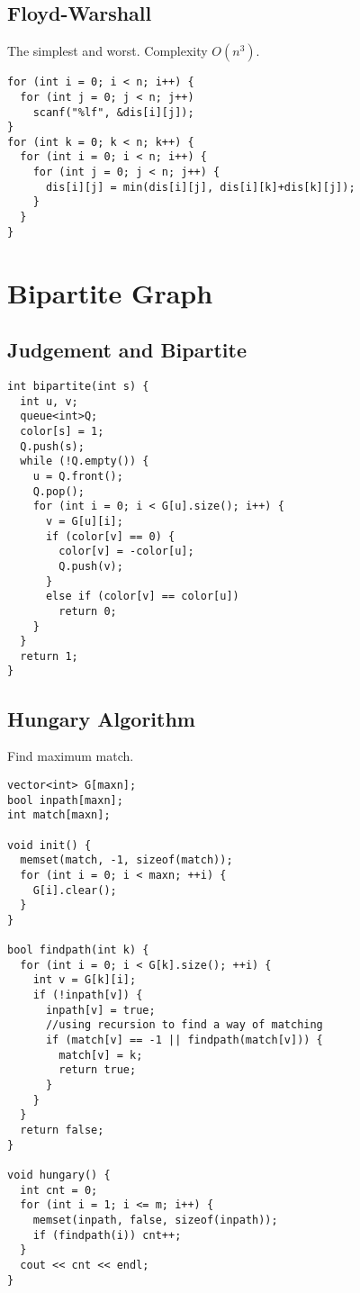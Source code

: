 \documentclass[11pt, a5paper, UTF8]{article}
\begin{document}
\subsection{Floyd-Warshall}
	The simplest and worst. Complexity $O(n^3)$.
\begin{lstlisting}
for (int i = 0; i < n; i++) {  
  for (int j = 0; j < n; j++)  
    scanf("%lf", &dis[i][j]);  
}  
for (int k = 0; k < n; k++) {  
  for (int i = 0; i < n; i++) {  
    for (int j = 0; j < n; j++) {  
      dis[i][j] = min(dis[i][j], dis[i][k]+dis[k][j]);  
    }  
  }
}
\end{lstlisting}

\section{Bipartite Graph}
\subsection{Judgement and Bipartite}
\begin{lstlisting}
int bipartite(int s) {  
  int u, v;  
  queue<int>Q;  
  color[s] = 1;  
  Q.push(s);  
  while (!Q.empty()) {  
    u = Q.front();  
    Q.pop();  
    for (int i = 0; i < G[u].size(); i++) {  
      v = G[u][i];  
      if (color[v] == 0) {  
        color[v] = -color[u];  
        Q.push(v);  
      }  
      else if (color[v] == color[u])  
        return 0;  
    }  
  }  
  return 1;  
}  
\end{lstlisting}
\subsection{Hungary Algorithm}
	Find maximum match.
\begin{lstlisting}
vector<int> G[maxn];  
bool inpath[maxn];
int match[maxn];

void init() {  
  memset(match, -1, sizeof(match));  
  for (int i = 0; i < maxn; ++i) {  
    G[i].clear();  
  }  
}  

bool findpath(int k) {  
  for (int i = 0; i < G[k].size(); ++i) {  
    int v = G[k][i];  
    if (!inpath[v]) {  
      inpath[v] = true;   
      //using recursion to find a way of matching
      if (match[v] == -1 || findpath(match[v])) {
        match[v] = k;
        return true;  
      }  
    }  
  }  
  return false;  
}  

void hungary() {  
  int cnt = 0;  
  for (int i = 1; i <= m; i++) {
    memset(inpath, false, sizeof(inpath)); 
    if (findpath(i)) cnt++;  
  }  
  cout << cnt << endl;  
}  
\end{lstlisting}
\end{document}
